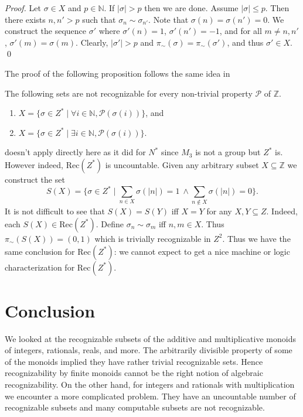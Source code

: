 \documentclass{llncs}
\begin{document}
\begin{proof}
  Let $\sigma \in X$ and $p \in \mathbb{N}$. If $|\sigma| > p$ then we are done. Assume $|\sigma| \le p$. Then there exists $n, n' > p$ such that $\sigma_n \sim \sigma_{n'}$. Note that $\sigma(n) = \sigma(n') = 0$. We construct the sequence $\sigma'$ where $\sigma'(n) = 1$, $\sigma'(n') = -1$, and for all $m \neq n, n'$, $\sigma'(m) = \sigma(m)$. Clearly, $|\sigma'| > p$ and $\pi_\sim(\sigma) = \pi_\sim(\sigma')$, and thus $\sigma' \in X$.
  \qed
\end{proof}

The proof of the following proposition follows the same idea in  

\begin{proposition}
  The following sets are not recognizable for every non-trivial property $\mathcal{P}$ of $\mathbb{Z}$.
  \begin{enumerate}
    \item $X = \{\sigma \in Z^* \mid \forall i \in \mathbb{N}, \mathcal{P}(\sigma(i))\}$, and 
  \item $X = \{\sigma \in Z^* \mid \exists i \in \mathbb{N}, \mathcal{P}(\sigma(i))\}$.
  \end{enumerate}
  \label{prop:Z*-unrecognizable}
\end{proposition}

 doesn't apply directly here as it did for $N^*$ since $M_3$ is not a group but $Z^*$ is. However indeed, $\text{Rec}(Z^*)$ is uncountable. Given any arbitrary subset $X \subseteq \mathbb{Z}$ we construct the set
\begin{equation*}
  S(X) = \{\sigma \in Z^* \mid \sum_{n \in X} \sigma(|n|) = 1\ \land \sum_{n \notin X} \sigma(|n|) = 0\}.
\end{equation*}
It is not difficult to see that $S(X) = S(Y)$ iff $X = Y$ for any $X, Y \subseteq Z$. Indeed, each $S(X) \in \text{Rec}(Z^*)$. Define $\sigma_n \sim \sigma_m$ iff $n, m \in X$. Thus $\pi_\sim(S(X)) = (0, 1)$ which is trivially recognizable in $Z^2$. Thus we have the same conclusion for $\text{Rec}(Z^*)$: we cannot expect to get a nice machine or logic characterization for $\text{Rec}(Z^*)$.


\section{Conclusion} \label{sec-conclusion}
We looked at the recognizable subsets of the additive and multiplicative monoids of integers, rationals, reals, and more. The arbitrarily divisible property of some of the monoids implied they have rather trivial recognizable sets. Hence recognizability by finite monoids cannot be the right notion of algebraic recognizability. On the other hand, for integers and rationals with multiplication we encounter a more complicated problem. They have an uncountable number of recognizable subsets and many computable subsets are not recognizable. 
\end{document}
